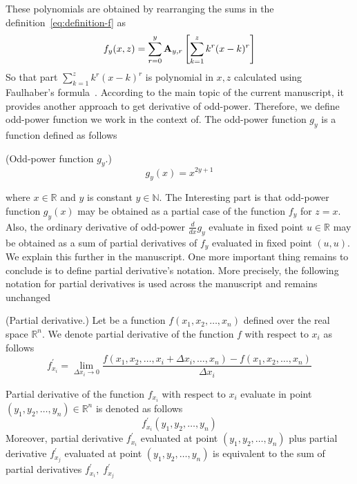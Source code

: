 These polynomials are obtained by rearranging the sums in the definition~\eqref{eq:definition-f} as
\[
    f_{y} (x, z) = \sum_{r=0}^{y} {\mathbf{A}} \sb{y,r} \left[ \sum_{k=1}^{z} k^r (x-k)^r \right]
\]
So that part $\sum_{k=1}^{z} k^r (x-k)^r$ is polynomial
in $x, z$ calculated using Faulhaber's formula~\cite{beardon1996sums}.
According to the main topic of the current manuscript, it provides another approach to get derivative of odd-power.
Therefore, we define odd-power function we work in the context of.
The odd-power function $g_y$ is a function defined as follows
\begin{definition}(Odd-power function $g_y$.)
    \begin{equation*}
        g_{y}(x) = x^{2y + 1}
    \end{equation*}
\end{definition}
where $x\in \mathbb{R}$ and $y$ is constant $y\in \mathbb{N}$.
The Interesting part is that odd-power function $g_{y} (x)$ may be obtained
as a partial case of the function $f_y$ for $z=x$.
Also, the ordinary derivative of odd-power $\frac{d}{dx} g_{y}$ evaluate in fixed point $u\in\mathbb{R}$
may be obtained as a sum of partial derivatives of $f_y$ evaluated in fixed point $(u,u)$.
We explain this further in the manuscript.
One more important thing remains to conclude is to define partial derivative's notation.
More precisely, the following notation for partial derivatives
is used across the manuscript and remains unchanged
\begin{notation} (Partial derivative.)
    Let be a function $f(x_1, x_2, \dots, x_n)$ defined over the real space $\mathbb{R}^n$.
    We denote partial derivative of the function $f$ with respect to $x_i$ as follows
    \begin{equation*}
        f^{'}_{x_i} = \lim_{\Delta x_i \to 0} \frac{f(x_1, x_2, \dots, x_i + \Delta x_i, \dots, x_n) - f(x_1, x_2, \dots, x_n)}{\Delta x_i}
    \end{equation*}
\end{notation}
Partial derivative of the function $f_{x_i}$ with respect to $x_i$
evaluate in point $(y_1, y_2, \dots, y_n) \in \mathbb{R}^n$ is denoted as follows
\begin{equation*}
    f^{'}_{x_i} (y_1, y_2, \dots, y_n)
\end{equation*}
Moreover, partial derivative $f^{'}_{x_i}$ evaluated at point $(y_1, y_2, \dots, y_n)$ plus
partial derivative $f^{'}_{x_j}$ evaluated at point $(y_1, y_2, \dots, y_n)$
is equivalent to the sum of partial derivatives $f^{'}_{x_i}, \; f^{'}_{x_j}$
